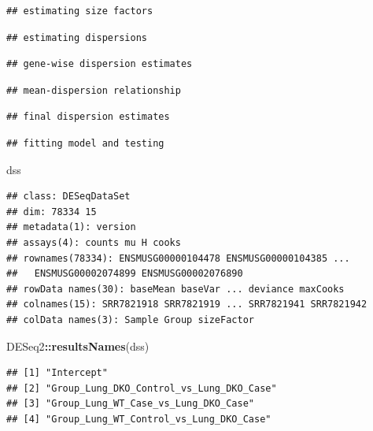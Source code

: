 \documentclass[
]{article}
\newenvironment{Shaded}{\begin{snugshade}}{\end{snugshade}}
\newcommand{\FunctionTok}[1]{\textcolor[rgb]{0.13,0.29,0.53}{\textbf{#1}}}
\newcommand{\NormalTok}[1]{#1}
\newcommand{\SpecialCharTok}[1]{\textcolor[rgb]{0.81,0.36,0.00}{\textbf{#1}}}
\begin{document}
\begin{verbatim}
## estimating size factors
\end{verbatim}

\begin{verbatim}
## estimating dispersions
\end{verbatim}

\begin{verbatim}
## gene-wise dispersion estimates
\end{verbatim}

\begin{verbatim}
## mean-dispersion relationship
\end{verbatim}

\begin{verbatim}
## final dispersion estimates
\end{verbatim}

\begin{verbatim}
## fitting model and testing
\end{verbatim}

\begin{Shaded}
\begin{Highlighting}[]
\NormalTok{dss}
\end{Highlighting}
\end{Shaded}

\begin{verbatim}
## class: DESeqDataSet 
## dim: 78334 15 
## metadata(1): version
## assays(4): counts mu H cooks
## rownames(78334): ENSMUSG00000104478 ENSMUSG00000104385 ...
##   ENSMUSG00002074899 ENSMUSG00002076890
## rowData names(30): baseMean baseVar ... deviance maxCooks
## colnames(15): SRR7821918 SRR7821919 ... SRR7821941 SRR7821942
## colData names(3): Sample Group sizeFactor
\end{verbatim}

\begin{Shaded}
\begin{Highlighting}[]
\NormalTok{DESeq2}\SpecialCharTok{::}\FunctionTok{resultsNames}\NormalTok{(dss)}
\end{Highlighting}
\end{Shaded}

\begin{verbatim}
## [1] "Intercept"                              
## [2] "Group_Lung_DKO_Control_vs_Lung_DKO_Case"
## [3] "Group_Lung_WT_Case_vs_Lung_DKO_Case"    
## [4] "Group_Lung_WT_Control_vs_Lung_DKO_Case"
\end{verbatim}
\end{document}
